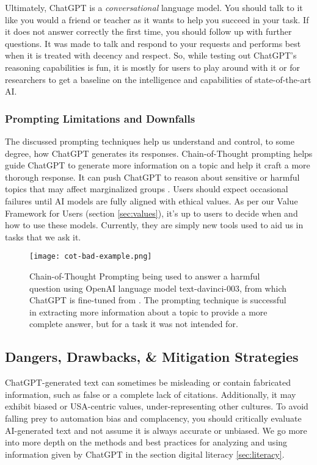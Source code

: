 \documentclass[12pt]{article}
\begin{document}
Ultimately, ChatGPT is a \textit{conversational} language model. You should talk to it like you would a friend or teacher as it wants to help you succeed in your task. If it does not answer correctly the first time, you should follow up with further questions. It was made to talk and respond to your requests and performs best when it is treated with decency and respect. So, while testing out ChatGPT's reasoning capabilities is fun, it is mostly for users to play around with it or for researchers to get a baseline on the intelligence and capabilities of state-of-the-art AI.

\subsubsection{Prompting Limitations and Downfalls}
The discussed prompting techniques help us understand and control, to some degree, how ChatGPT generates its responses. Chain-of-Thought prompting helps guide ChatGPT to generate more information on a topic and help it craft a more thorough response. It can push ChatGPT to reason about sensitive or harmful topics that may affect marginalized groups \cite{shaikh2022second}. Users should expect occasional failures until AI models are fully aligned with ethical values. As per our Value Framework for Users (section \ref{sec:values}), it's up to users to decide when and how to use these models. Currently, they are simply new tools used to aid us in tasks that we ask it.

\begin{figure}[H]
  \centering
  \texttt{[image: cot-bad-example.png]}
  \caption{Chain-of-Thought Prompting being used to answer a harmful question using OpenAI language model text-davinci-003, from which ChatGPT is fine-tuned from \cite{shaikh2022second}. The prompting technique is successful in extracting more information about a topic to provide a more complete answer, but for a task it was not intended for.}
\end{figure}

\subsection{Dangers, Drawbacks, \& Mitigation Strategies}\label{sec:dangers} 
ChatGPT-generated text can sometimes be misleading or contain fabricated information, such as false or a complete lack of citations. Additionally, it may exhibit biased or USA-centric values, under-representing other cultures. To avoid falling prey to automation bias and complacency, you should critically evaluate AI-generated text and not assume it is always accurate or unbiased. We go more into more depth on the methods and best practices for analyzing and using information given by ChatGPT in the section digital literacy \ref{sec:literacy}.
\end{document}
